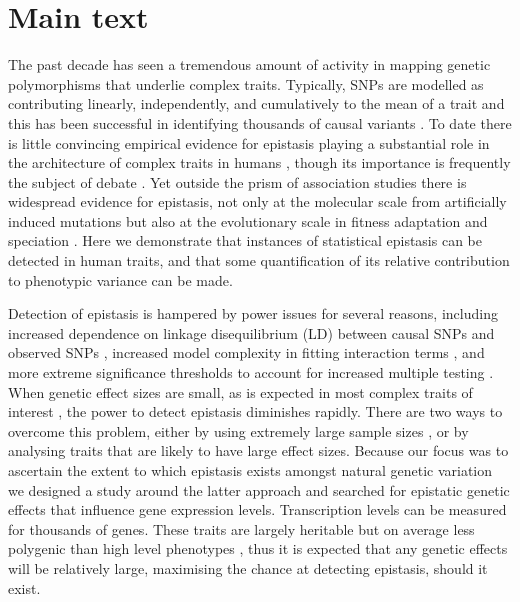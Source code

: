 \documentclass{article}
\begin{document}
\section{Main text}

The past decade has seen a tremendous amount of activity in mapping genetic polymorphisms that underlie complex traits. Typically, SNPs are modelled as contributing linearly, independently, and cumulatively to the mean of a trait and this has been successful in identifying thousands of causal variants \cite{Visscher2012}. To date there is little convincing empirical evidence for epistasis playing a substantial role in the architecture of complex traits in humans \cite{Strange2010, Evans2011}, though its importance is frequently the subject of debate \cite{Carlborg2004, Hill2008a, Crow2010}. Yet outside the prism of association studies there is widespread evidence for epistasis, not only at the molecular scale from artificially induced mutations \cite{Costanzo2010} but also at the evolutionary scale in fitness adaptation \cite{Weinreich2006} and speciation \cite{Breen2012}. Here we demonstrate that instances of statistical epistasis can be detected in human traits, and that some quantification of its relative contribution to phenotypic variance can be made.

Detection of epistasis is hampered by power issues for several reasons, including increased dependence on linkage disequilibrium (LD) between causal SNPs and observed SNPs \cite{Weir2008, Hemani2013}, increased model complexity in fitting interaction terms \cite{Marchini2005}, and more extreme significance thresholds to account for increased multiple testing \cite{Cordell2009}. When genetic effect sizes are small, as is expected in most complex traits of interest \cite{Visscher2012}, the power to detect epistasis diminishes rapidly. There are two ways to overcome this problem, either by using extremely large sample sizes \cite{LangoAllen2010}, or by analysing traits that are likely to have large effect sizes. Because our focus was to ascertain the extent to which epistasis exists amongst natural genetic variation we designed a study around the latter approach and searched for epistatic genetic effects that influence gene expression levels. Transcription levels can be measured for thousands of genes. These traits are largely heritable but on average less polygenic than high level phenotypes \cite{Powell2013}, thus it is expected that any genetic effects will be relatively large, maximising the chance at detecting epistasis, should it exist.
\end{document}
